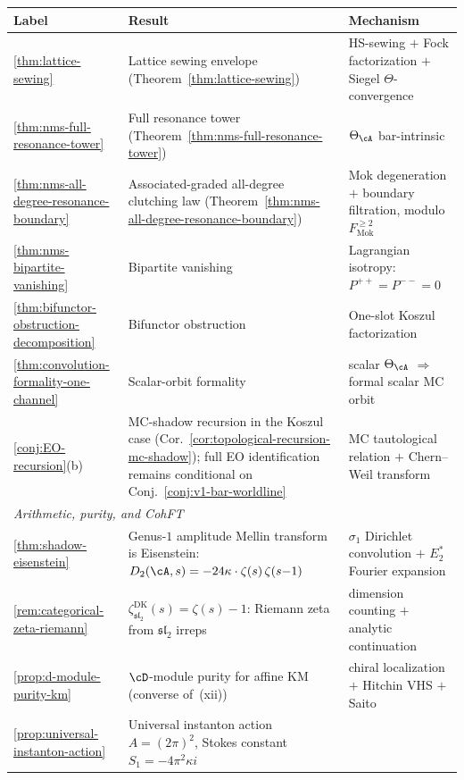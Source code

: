 \begin{center}
\renewcommand{\arraystretch}{1.25}
\begin{tabular}{lp{8cm}l}
\textbf{Label} & \textbf{Result} & \textbf{Mechanism} \\
\hline
\ref{thm:lattice-sewing}
 & Lattice sewing envelope
 (Theorem~\ref{thm:lattice-sewing})
 & HS-sewing $+$ Fock factorization
 $+$ Siegel $\Theta$-convergence \\
\ref{thm:nms-full-resonance-tower}
 & Full resonance tower
 (Theorem~\ref{thm:nms-full-resonance-tower})
 & $\Theta_\cA$ bar-intrinsic \\
\ref{thm:nms-all-degree-resonance-boundary}
 & Associated-graded all-degree clutching law
 (Theorem~\ref{thm:nms-all-degree-resonance-boundary})
 & Mok degeneration $+$ boundary filtration, modulo
 $F_{\mathrm{Mok}}^{\ge2}$ \\
\ref{thm:nms-bipartite-vanishing}
 & Bipartite vanishing
 & Lagrangian isotropy: $P^{++} = P^{--} = 0$ \\
\ref{thm:bifunctor-obstruction-decomposition}
 & Bifunctor obstruction
 & One-slot Koszul factorization \\
\ref{thm:convolution-formality-one-channel}
 & Scalar-orbit formality
 & scalar $\Theta_\cA$ $\Rightarrow$
 formal scalar MC orbit \\
\ref{conj:EO-recursion}\textup{(b)}
 & MC-shadow recursion in the Koszul case
 \textup{(}Cor.~\ref{cor:topological-recursion-mc-shadow}\textup{)};
 full EO identification remains conditional on
 Conj.~\ref{conj:v1-bar-worldline}
 & MC tautological relation $+$ Chern--Weil transform \\
\hline
\multicolumn{3}{l}{\textit{Arithmetic, purity, and CohFT}} \\
\hline
\ref{thm:shadow-eisenstein}
 & Genus-$1$ amplitude Mellin transform is Eisenstein:
 $D_2(\cA,s) = -24\kappa \cdot \zeta(s)\,\zeta(s{-}1)$
 & $\sigma_1$ Dirichlet convolution $+$ $E_2^*$ Fourier expansion \\
\ref{rem:categorical-zeta-riemann}
 & $\zeta^{\mathrm{DK}}_{\mathfrak{sl}_2}(s) = \zeta(s) - 1$:
 Riemann zeta from $\mathfrak{sl}_2$ irreps
 & dimension counting $+$ analytic continuation \\
\ref{prop:d-module-purity-km}
 & $\cD$-module purity for affine KM
 \textup{(}converse of~(xii)\textup{)}
 & chiral localization $+$ Hitchin VHS $+$ Saito \\
\ref{prop:universal-instanton-action}
 & Universal instanton action $A = (2\pi)^2$,
 Stokes constant $S_1 = -4\pi^2\kappa i$

\end{tabular}
\end{center}
